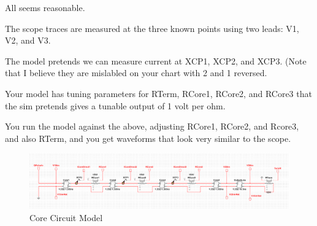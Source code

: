 \documentclass{article}
\begin{document}
All seems reasonable.

The scope traces are measured at the three known points using two leads: V1, V2, and V3.

The model pretends we can measure current at XCP1, XCP2, and XCP3.  (Note that I believe they are mislabled on your chart with 2 and 1 reversed.

Your model has tuning parameters for RTerm, RCore1, RCore2, and RCore3 that the sim pretends gives a tunable output of 1 volt per ohm.

You run the model against the above, adjusting RCore1, RCore2, and Rcore3, and also RTerm, and you get waveforms that look very similar to the scope.

\begin{figure}
[h]
\begin{center}
\includegraphics[scale=0.4]{image.png} 
\caption{Core Circuit Model}%
\end{center}
\end{figure}
\end{document}
